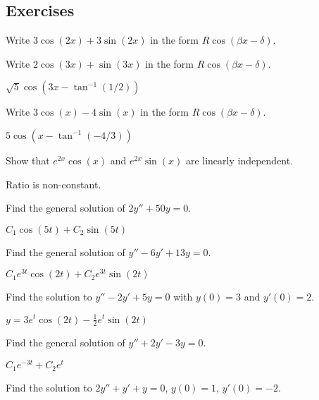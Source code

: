 \subsection{Exercises}

\begin{exercise}\ansMark%
Write $3 \cos(2x) + 3\sin(2x)$ in the form $R \cos(\beta x - \delta)$.
\end{exercise}
%

\begin{exercise}
Write $2 \cos(3x) + \sin(3x)$ in the form $R \cos(\beta x - \delta)$.
\end{exercise}
\comboSol{%
}
{%
$\sqrt{5}\cos(3x - \tan^{-1}(1/2))$
}

\begin{exercise}
Write $3 \cos(x) - 4\sin(x)$ in the form $R \cos(\beta x - \delta)$.
\end{exercise}
\comboSol{%
}
{%
$5\cos(x - \tan^{-1}(-4/3))$
}

\begin{exercise}
Show that $e^{2x}\cos(x)$ and $e^{2x}\sin(x)$ are linearly independent.
\end{exercise}
\comboSol{%
}
{%
Ratio is non-constant.
}

\begin{exercise}
Find the general solution of $2y'' + 50y = 0$.
\end{exercise}
\comboSol{%
}
{%
$C_1\cos(5t) + C_2\sin(5t)$
}

\begin{exercise}
Find the general solution of $y'' - 6 y' + 13 y = 0$.
\end{exercise}
\comboSol{%
}
{%
$C_1e^{3t}\cos(2t) + C_2e^{3t}\sin(2t)$
}

\begin{exercise}
Find the solution to $y'' - 2y' + 5y = 0$ with $y(0) = 3$ and $y'(0) = 2$. 
\end{exercise} 
\comboSol{%
}
{%
$y = 3e^t\cos(2t) - \frac{1}{2}e^t\sin(2t)$
}

\begin{exercise}
Find the general solution of $y'' + 2y' - 3y = 0$.
\end{exercise}
\comboSol{%
}
{%
$C_1e^{-3t} + C_2e^t$
}

\begin{exercise}\ansMark%
Find the solution to
$2y''+y'+y=0$, $y(0) = 1$, $y'(0)=-2$.
\end{exercise}

